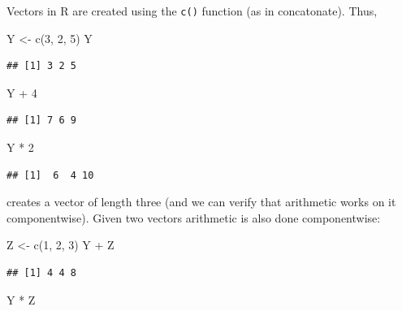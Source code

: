 \documentclass[
]{book}
\newenvironment{Shaded}{\begin{snugshade}}{\end{snugshade}}
\newcommand{\DecValTok}[1]{\textcolor[rgb]{0.00,0.00,0.81}{#1}}
\newcommand{\FunctionTok}[1]{\textcolor[rgb]{0.00,0.00,0.00}{#1}}
\newcommand{\NormalTok}[1]{#1}
\newcommand{\OtherTok}[1]{\textcolor[rgb]{0.56,0.35,0.01}{#1}}
\newcommand{\SpecialCharTok}[1]{\textcolor[rgb]{0.00,0.00,0.00}{#1}}
\begin{document}
Vectors in R are created using the \texttt{c()} function (as in concatonate). Thus,

\begin{Shaded}
\begin{Highlighting}[]
\NormalTok{Y }\OtherTok{\textless{}{-}} \FunctionTok{c}\NormalTok{(}\DecValTok{3}\NormalTok{, }\DecValTok{2}\NormalTok{, }\DecValTok{5}\NormalTok{)}
\NormalTok{Y}
\end{Highlighting}
\end{Shaded}

\begin{verbatim}
## [1] 3 2 5
\end{verbatim}

\begin{Shaded}
\begin{Highlighting}[]
\NormalTok{Y }\SpecialCharTok{+} \DecValTok{4}
\end{Highlighting}
\end{Shaded}

\begin{verbatim}
## [1] 7 6 9
\end{verbatim}

\begin{Shaded}
\begin{Highlighting}[]
\NormalTok{Y }\SpecialCharTok{*} \DecValTok{2}
\end{Highlighting}
\end{Shaded}

\begin{verbatim}
## [1]  6  4 10
\end{verbatim}

creates a vector of length three (and we can verify that arithmetic works on it componentwise). Given two vectors arithmetic is also done componentwise:

\begin{Shaded}
\begin{Highlighting}[]
\NormalTok{Z }\OtherTok{\textless{}{-}} \FunctionTok{c}\NormalTok{(}\DecValTok{1}\NormalTok{, }\DecValTok{2}\NormalTok{, }\DecValTok{3}\NormalTok{)}
\NormalTok{Y }\SpecialCharTok{+}\NormalTok{ Z}
\end{Highlighting}
\end{Shaded}

\begin{verbatim}
## [1] 4 4 8
\end{verbatim}

\begin{Shaded}
\begin{Highlighting}[]
\NormalTok{Y }\SpecialCharTok{*}\NormalTok{ Z}
\end{Highlighting}
\end{Shaded}
\end{document}
